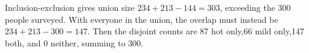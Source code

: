 Inclusion-exclusion gives union size $ 234+213-144=303 $, exceeding the 300 people surveyed. With everyone in the union, the overlap must instead be $ 234+213-300=\boxed{147}$. Then the disjoint counts are 87 hot only,66 mild only,147 both, and 0 neither, summing to 300.
